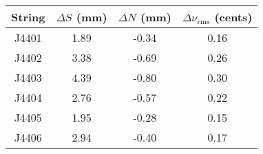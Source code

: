 \begin{tabular}{cccc}
\toprule
String &  $\Delta S$ (mm) &  $\Delta N$ (mm) &  $\overline{\Delta \nu}_\text{rms}$ (cents) \\
\midrule
 J4401 &             1.89 &            -0.34 &                                        0.16 \\
 J4402 &             3.38 &            -0.69 &                                        0.26 \\
 J4403 &             4.39 &            -0.80 &                                        0.30 \\
 J4404 &             2.76 &            -0.57 &                                        0.22 \\
 J4405 &             1.95 &            -0.28 &                                        0.15 \\
 J4406 &             2.94 &            -0.40 &                                        0.17 \\
\bottomrule
\end{tabular}

